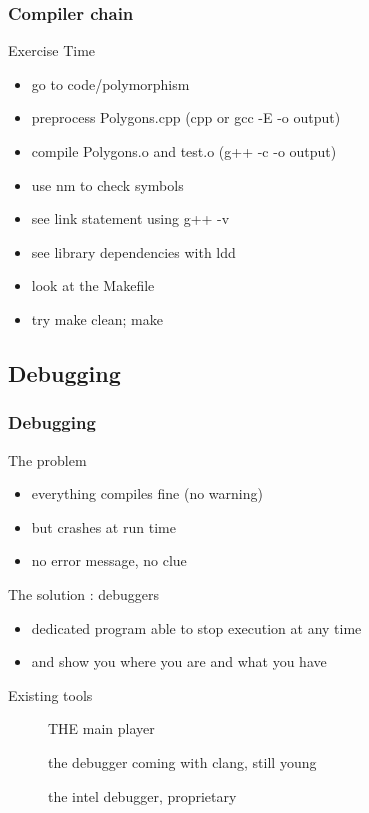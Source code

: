 \begin{frame}[fragile]
  \frametitle{Compiler chain}
  \begin{alertblock}{Exercise Time}
    \begin{itemize}
    \item go to code/polymorphism
    \item preprocess Polygons.cpp (cpp or gcc -E -o output)
    \item compile Polygons.o and test.o (g++ -c -o output)
    \item use nm to check symbols
    \item see link statement using g++ -v
    \item see library dependencies with ldd
    \item look at the Makefile
    \item try make clean; make
    \end{itemize}
  \end{alertblock}
\end{frame}

\subsection[gdb]{Debugging}

\begin{frame}[fragile]
  \frametitle{Debugging}
  \begin{alertblock}{The problem}
    \begin{itemize}
      \item everything compiles fine (no warning)
      \item but crashes at run time
      \item no error message, no clue
    \end{itemize}
  \end{alertblock}
  \pause
  \begin{block}{The solution : debuggers}
    \begin{itemize}
    \item dedicated program able to stop execution at any time
    \item and show you where you are and what you have
    \end{itemize}
  \end{block}
  \pause
  \begin{block}{Existing tools}
    \begin{description}
    \item[\href{http://www.sourceware.org/gdb/}{}]
      THE main player
    \item[\href{http://lldb.llvm.org/}{}]
      the debugger coming with clang, still young
    \item[\href{http://software.intel.com/en-us/articles/idb-linux}{}]
      the intel debugger, proprietary
    \end{description}
  \end{block}
\end{frame}

